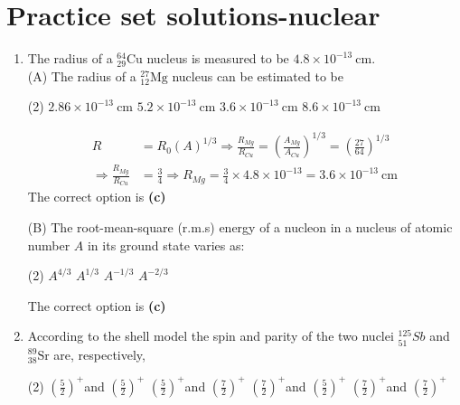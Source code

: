 \chapter{Practice set solutions-nuclear}
\begin{enumerate}
	\item The radius of a ${ }_{29}^{64} \mathrm{Cu}$ nucleus is measured to be $4.8 \times 10^{-13} \mathrm{~cm}$.
	{}\\
(A) The radius of a ${ }_{12}^{27} \mathrm{Mg}$ nucleus can be estimated to be
\begin{tasks}(2)
	\task[\textbf{A.}] $2.86 \times 10^{-13} \mathrm{~cm}$
	\task[\textbf{B.}]$5.2 \times 10^{-13} \mathrm{~cm}$
	\task[\textbf{C.}] $3.6 \times 10^{-13} \mathrm{~cm}$
	\task[\textbf{D.}]$8.6 \times 10^{-13} \mathrm{~cm}$
\end{tasks}
\begin{answer}
\begin{align*}
R&=R_{0}(A)^{1 / 3} \Rightarrow \frac{R_{M g}}{R_{C u}}=\left(\frac{A_{M g}}{A_{C u}}\right)^{1 / 3}=\left(\frac{27}{64}\right)^{1 / 3}\\
\Rightarrow \frac{R_{M g}}{R_{C u}}&=\frac{3}{4} \Rightarrow R_{M g}=\frac{3}{4} \times 4.8 \times 10^{-13}=3.6 \times 10^{-13} \mathrm{~cm}
\end{align*}
The correct option is \textbf{(c)}	
\end{answer}
(B) The root-mean-square (r.m.s) energy of a nucleon in a nucleus of atomic number $A$ in its ground state varies as:
\begin{tasks}(2)
	\task[\textbf{A.}] $A^{4 / 3}$
	\task[\textbf{B.}]$A^{1 / 3}$
	\task[\textbf{C.}] $A^{-1 / 3}$
	\task[\textbf{D.}] $A^{-2 / 3}$
\end{tasks}
\begin{answer}
	The correct option is \textbf{(c)}
\end{answer}
	\item According to the shell model the spin and parity of the two nuclei ${ }_{51}^{125} S b$ and ${ }_{38}^{89} \mathrm{Sr}$ are, respectively,
	{}\\
\begin{tasks}(2)
	\task[\textbf{A.}] $\left(\frac{5}{2}\right)^{+}$and $\left(\frac{5}{2}\right)^{+}$
	\task[\textbf{B.}]$\left(\frac{5}{2}\right)^{+}$and $\left(\frac{7}{2}\right)^{+}$
	\task[\textbf{C.}]$\left(\frac{7}{2}\right)^{+}$and $\left(\frac{5}{2}\right)^{+}$
	\task[\textbf{D.}]$\left(\frac{7}{2}\right)^{+}$and $\left(\frac{7}{2}\right)^{+}$

\end{tasks}
\end{enumerate}
